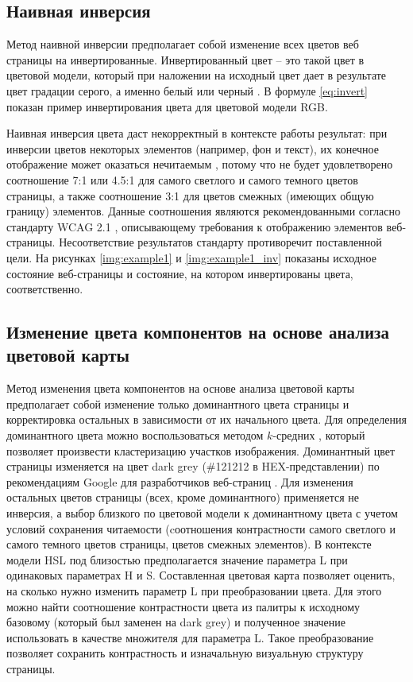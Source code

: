 \subsection{Наивная инверсия}

Метод наивной инверсии предполагает собой изменение всех цветов веб страницы на инвертированные. Инвертированный цвет -- это такой цвет в цветовой модели, который при наложении на исходный цвет дает в результате цвет градации серого, а именно белый или черный \cite{complementary}. В формуле \ref{eq:invert} показан пример инвертирования цвета для цветовой модели RGB.

Наивная инверсия цвета даст некорректный в контексте работы результат: при инверсии цветов некоторых элементов (например, фон и текст), их конечное отображение может оказаться нечитаемым \cite{invbad}, потому что не будет удовлетворено соотношение 7:1 или 4.5:1 \cite{wcag1} для самого светлого и самого темного цветов страницы, а также соотношение 3:1 \cite{wcag2} для цветов смежных (имеющих общую границу) элементов. Данные соотношения являются рекомендованными согласно стандарту WCAG 2.1 \cite{wcag}, описывающему требования к отображению элементов веб-страницы. Несоответствие результатов стандарту противоречит поставленной цели. На рисунках \ref{img:example1} и \ref{img:example1_inv} показаны исходное состояние веб-страницы и состояние, на котором инвертированы цвета, соответственно.




\subsection{Изменение цвета компонентов на основе анализа цветовой карты}

Метод изменения цвета компонентов на основе анализа цветовой карты  предполагает собой изменение только доминантного цвета страницы и корректировка остальных в зависимости от их начального цвета. Для определения доминантного цвета можно воспользоваться методом $k$-средних \cite{kmeans}, который позволяет произвести кластеризацию участков изображения. Доминантный цвет страницы изменяется на цвет dark grey (\#121212 в HEX-представлении) по рекомендациям Google для разработчиков веб-страниц \cite{material}. Для изменения остальных цветов страницы (всех, кроме доминантного) применяется не инверсия, а выбор близкого по цветовой модели к доминантному цвета с учетом условий сохранения читаемости \cite{wcag} (cоотношения контрастности самого светлого и самого темного цветов страницы, цветов смежных элементов). В контексте модели HSL под близостью предполагается значение параметра L при одинаковых параметрах H и S. Составленная цветовая карта позволяет оценить, на сколько нужно изменить параметр L при преобразовании цвета. Для этого можно найти соотношение контрастности цвета из палитры к исходному базовому (который был заменен на dark grey) и полученное значение использовать в качестве множителя для параметра L. Такое преобразование позволяет сохранить контрастность и  изначальную визуальную структуру страницы.
 
